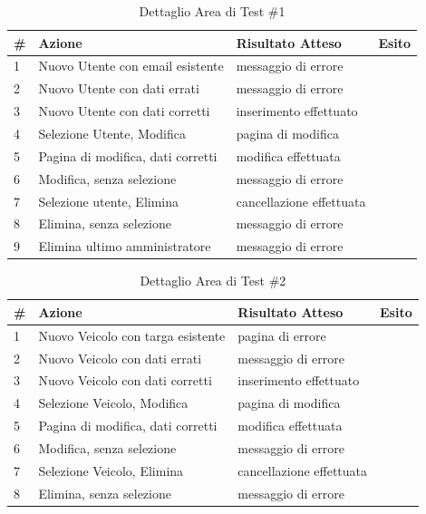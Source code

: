 \documentclass[a4paper,12pt]{article}
\begin{document}
\begin{table}[H]
\begin{center}
\caption{Dettaglio Area di Test \#1}
\begin{tabular}{p{0.5cm} p{6.5cm} p{5cm} p{1cm}}
\rowcolor{Ash}
\hline
\# & Azione & Risultato Atteso & Esito \\ \hline
1 & Nuovo Utente con email esistente				&		messaggio di errore		&\cellcolor{green}{OK}\\
2 & Nuovo Utente con dati errati					&		messaggio di errore		&\cellcolor{green}{OK}\\
3 & Nuovo Utente con dati corretti					&		inserimento effettuato	&\cellcolor{green}{OK}\\
4 & Selezione Utente, Modifica						&		pagina di modifica		&\cellcolor{green}{OK}\\
5 & Pagina di modifica, dati corretti					&		modifica effettuata		&\cellcolor{green}{OK}\\
6 & Modifica, senza selezione						&		messaggio di errore		&\cellcolor{green}{OK}\\
7 & Selezione utente, Elimina						&		cancellazione effettuata	&\cellcolor{green}{OK}\\
8 & Elimina, senza selezione						&		messaggio di errore		&\cellcolor{green}{OK}\\
9 & Elimina ultimo amministratore					&		messaggio di errore		&\cellcolor{green}{OK}\\ \hline
\end{tabular}{}
\end{center}
\end{table}

\begin{table}[H]
\begin{center}
\caption{Dettaglio Area di Test \#2}
\begin{tabular}{p{0.5cm} p{6.5cm} p{5cm} p{1cm}}
\rowcolor{Ash}
\hline
\# & Azione & Risultato Atteso & Esito \\ \hline
1 & Nuovo Veicolo con targa esistente				&		pagina di errore		&\cellcolor{green}{OK}\\
2 & Nuovo Veicolo con dati errati					&		messaggio di errore		&\cellcolor{green}{OK}\\
3 & Nuovo Veicolo con dati corretti					&		inserimento effettuato	&\cellcolor{green}{OK}\\
4 & Selezione Veicolo, Modifica					&		pagina di modifica		&\cellcolor{green}{OK}\\
5 & Pagina di modifica, dati corretti					&		modifica effettuata		&\cellcolor{green}{OK}\\
6 & Modifica, senza selezione						&		messaggio di errore		&\cellcolor{green}{OK}\\
7 & Selezione Veicolo, Elimina						&		cancellazione effettuata	&\cellcolor{green}{OK}\\
8 & Elimina, senza selezione						&		messaggio di errore		&\cellcolor{green}{OK}\\ \hline
\end{tabular}
\end{center}
\end{table}
\end{document}

